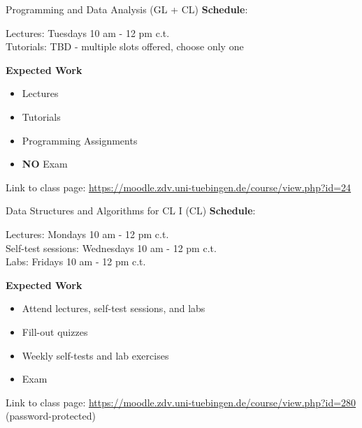 \documentclass[aspectratio=169,hyperref={unicode},xcolor={dvipsnames}]{beamer}
\begin{document}
\begin{frame}{Programming and Data Analysis \hspace{6.2cm} (GL + CL)}
		\textbf{Schedule}:
		
		Lectures: Tuesdays 10 am - 12 pm c.t.\\
		Tutorials: TBD - multiple slots offered, choose only one
		\newline
		
		\textbf{Expected Work}
		\begin{itemize}
			\item Lectures
			\item Tutorials
			\item Programming Assignments
			\item \textbf{NO} Exam
		\end{itemize}
		
		\begin{center}
	Link to class page: \url{https://moodle.zdv.uni-tuebingen.de/course/view.php?id=24}
\end{center}
\end{frame}

\begin{frame}{Data Structures and Algorithms for CL I\hspace{6cm} (CL)}
		\textbf{Schedule}:
		
		Lectures: Mondays 10 am - 12 pm c.t.\\
		Self-test sessions: Wednesdays 10 am - 12 pm c.t.\\
		Labs: Fridays 10 am - 12 pm c.t.
			
		\textbf{Expected Work}
		\begin{itemize}
			\item Attend lectures, self-test sessions, and labs		
			\item Fill-out quizzes
			\item Weekly self-tests and lab exercises
			\item Exam
		\end{itemize}
		
		\begin{center}
	Link to class page: \url{https://moodle.zdv.uni-tuebingen.de/course/view.php?id=280} (password-protected)
\end{center}
\end{frame}
\end{document}
